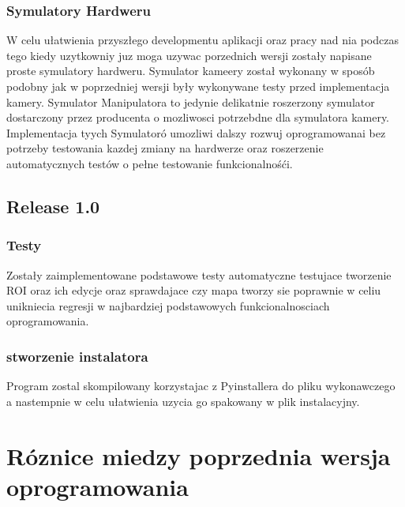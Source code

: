 \documentclass[11pt,a4paper]{article}
\begin{document}
    \subsubsection{Symulatory Hardweru}
    \hspace{1cm} W celu ułatwienia przyszłego developmentu aplikacji oraz pracy nad nia podczas tego kiedy uzytkowniy juz moga uzywac porzednich wersji zostały napisane proste symulatory hardweru. Symulator kameery został wykonany w sposób podobny jak w poprzedniej wersji były wykonywane testy przed implementacja kamery. Symulator Manipulatora to jedynie delikatnie roszerzony symulator dostarczony przez producenta o mozliwosci potrzebdne dla symulatora kamery. Implementacja tyych Symulatoró umozliwi dalszy rozwuj oprogramowanai bez potrzeby testowania kazdej zmiany na hardwerze oraz roszerzenie automatycznych testów o pełne testowanie funkcionalnośći.

    \subsection{Release 1.0}

    \subsubsection{Testy}
    \hspace{1cm} Zostały zaimplementowane podstawowe testy automatyczne testujace tworzenie ROI oraz ich edycje oraz sprawdajace czy mapa tworzy sie poprawnie w celiu unikniecia regresji w najbardziej podstawowych funkcionalnosciach oprogramowania.

    \subsubsection{stworzenie instalatora}
    \hspace{1cm} Program zostal skompilowany korzystajac z Pyinstallera do pliku wykonawczego a nastempnie w celu ułatwienia uzycia go spakowany w plik instalacyjny.


    \newpage


    \section{Róznice miedzy poprzednia wersja oprogramowania}
\end{document}
